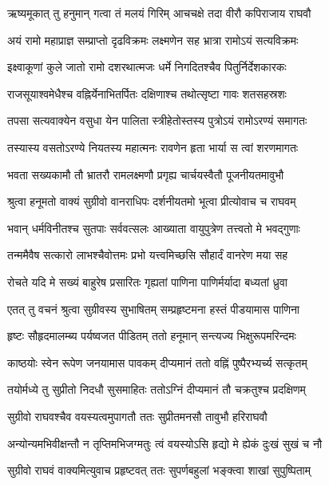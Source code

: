 
\twolineshloka
{ऋष्यमूकात् तु हनुमान् गत्वा तं मलयं गिरिम्}
{आचचक्षे तदा वीरौ कपिराजाय राघवौ} %

\twolineshloka
{अयं रामो महाप्राज्ञ सम्प्राप्तो दृढविक्रमः}
{लक्ष्मणेन सह भ्रात्रा रामोऽयं सत्यविक्रमः} %

\twolineshloka
{इक्ष्वाकूणां कुले जातो रामो दशरथात्मजः}
{धर्मे निगदितश्चैव पितुर्निर्देशकारकः} %

\twolineshloka
{राजसूयाश्वमेधैश्च वह्निर्येनाभितर्पितः}
{दक्षिणाश्च तथोत्सृष्टा गावः शतसहस्रशः} %

\twolineshloka
{तपसा सत्यवाक्येन वसुधा येन पालिता}
{स्त्रीहेतोस्तस्य पुत्रोऽयं रामोऽरण्यं समागतः} %

\twolineshloka
{तस्यास्य वसतोऽरण्ये नियतस्य महात्मनः}
{रावणेन हृता भार्या स त्वां शरणमागतः} %

\twolineshloka
{भवता सख्यकामौ तौ भ्रातरौ रामलक्ष्मणौ}
{प्रगृह्य चार्चयस्वैतौ पूजनीयतमावुभौ} %

\twolineshloka
{श्रुत्वा हनूमतो वाक्यं सुग्रीवो वानराधिपः}
{दर्शनीयतमो भूत्वा प्रीत्योवाच च राघवम्} %

\twolineshloka
{भवान् धर्मविनीतश्च सुतपाः सर्ववत्सलः}
{आख्याता वायुपुत्रेण तत्त्वतो मे भवद्गुणाः} %

\twolineshloka
{तन्ममैवैष सत्कारो लाभश्चैवोत्तमः प्रभो}
{यत्त्वमिच्छसि सौहार्दं वानरेण मया सह} %

\twolineshloka
{रोचते यदि मे सख्यं बाहुरेष प्रसारितः}
{गृह्यतां पाणिना पाणिर्मर्यादा बध्यतां ध्रुवा} %

\twolineshloka
{एतत् तु वचनं श्रुत्वा सुग्रीवस्य सुभाषितम्}
{सम्प्रहृष्टमना हस्तं पीडयामास पाणिना} %

\twolineshloka
{हृष्टः सौहृदमालम्ब्य पर्यष्वजत पीडितम्}
{ततो हनूमान् सन्त्यज्य भिक्षुरूपमरिन्दमः} %

\twolineshloka
{काष्ठयोः स्वेन रूपेण जनयामास पावकम्}
{दीप्यमानं ततो वह्निं पुष्पैरभ्यर्च्य सत्कृतम्} %

\twolineshloka
{तयोर्मध्ये तु सुप्रीतो निदधौ सुसमाहितः}
{ततोऽग्निं दीप्यमानं तौ चक्रतुश्च प्रदक्षिणम्} %

\twolineshloka
{सुग्रीवो राघवश्चैव वयस्यत्वमुपागतौ}
{ततः सुप्रीतमनसौ तावुभौ हरिराघवौ} %

\twolineshloka
{अन्योन्यमभिवीक्षन्तौ न तृप्तिमभिजग्मतुः}
{त्वं वयस्योऽसि हृद्यो मे ह्येकं दुःखं सुखं च नौ} %

\twolineshloka
{सुग्रीवो राघवं वाक्यमित्युवाच प्रहृष्टवत्}
{ततः सुपर्णबहुलां भङ्क्त्वा शाखां सुपुष्पिताम्} %

